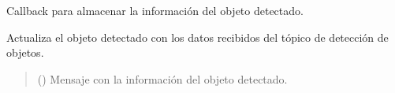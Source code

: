 \documentclass[a4paper,10pt,spanish]{sphinxmanual}
\begin{document}
\begin{fulllineitems}
\begin{fulllineitems}
\begin{quote}
\begin{description}
\sphinxAtStartPar
{}

\end{description}\end{quote}

\end{fulllineitems}


\begin{fulllineitems}
\label{\detokenize{squad_approach_control_action:squad_approach_control_action.CenterObjectState.object_callback}}
\pysigstartsignatures
{}
\pysigstopsignatures
\sphinxAtStartPar
Callback para almacenar la información del objeto detectado.

\sphinxAtStartPar
Actualiza el objeto detectado con los datos recibidos del tópico de detección de objetos.
\begin{quote}\begin{description}
\sphinxAtStartPar
{} () \textendash{} Mensaje con la información del objeto detectado.

\end{description}\end{quote}

\end{fulllineitems}


\end{fulllineitems}

\end{document}
